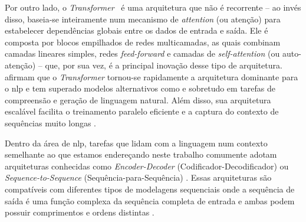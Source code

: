 

Por outro lado, o \textit{Transformer}~\cite{vaswani-2017-transformer} é uma arquitetura que não é recorrente -- ao invés disso, baseia-se inteiramente num mecanismo de \textit{attention} (ou atenção) para estabelecer dependências globais entre os dados de entrada e saída. 
Ele é composta por blocos empilhados de redes multicamadas, as quais combinam camadas lineares simples, redes \textit{feed-forward} e camadas de \textit{self-attention} (ou auto-atenção) -- que, por sua vez, é a principal inovação desse tipo de arquitetura.
 afirmam que o \textit{Transformer} tornou-se rapidamente a arquitetura dominante para o \acrshort{nlp} e tem superado modelos alternativos como  e  sobretudo em tarefas de compreensão e geração de linguagem natural. Além disso, sua arquitetura escalável facilita o treinamento paralelo eficiente e a captura do contexto de sequências muito longas 
\cite{vaswani-2017-transformer,jurafsky-2022-speech-lang-processing,wolf-2020-transformers}.



Dentro da área de \acrshort{nlp}, tarefas que lidam com a linguagem num contexto semelhante ao que estamos endereçando neste trabalho comumente adotam arquiteturas conhecidas como \textit{Encoder-Decoder} (Codificador-Decodificador) ou \textit{Sequence-to-Sequence} (Sequência-para-Sequência) \cite{cho-2014-encoder-decoder,sutskever-2014-seq-to-seq}.
Essas arquiteturas são compatíveis com diferentes tipos de modelagens sequenciais onde a sequência de saída é uma função complexa da sequência completa de entrada e ambas podem possuir comprimentos e ordens distintas \cite{jurafsky-2022-speech-lang-processing,goodfellow-2016-deep-learning}.

